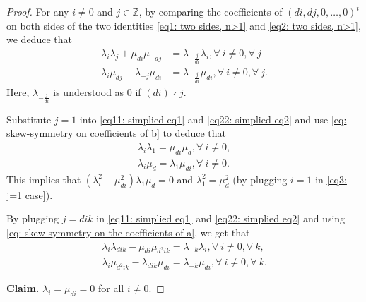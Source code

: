 \documentclass[12pt]{amsart}
\theoremstyle{definition}
\theoremstyle{remark}
\begin{document}
\begin{proof}
For any $i\neq 0$ and $j\in\mathbb{Z}$, by comparing the coefficients of $(di,dj,0,\ldots,0)^t$ on both sides of the two identities \eqref{eq1: two sides, n>1} and \eqref{eq2: two sides, n>1}, we deduce that 
\begin{align}
\label{eq11: simplied eq1} \lambda_i\lambda_j+\mu_{di}\mu_{-dj}&=\lambda_{-\frac{j}{di}}\lambda_i, \forall~ i\neq 0, \forall ~j\\
\label{eq22: simplied eq2} \lambda_i\mu_{dj}+\lambda_{-j}\mu_{di}&=\lambda_{-\frac{j}{di}}\mu_{di}, \forall~i\neq 0,\forall~j.
\end{align}
Here, $\lambda_{-\frac{j}{di}}$ is understood as 0 if $(di)\nmid j$.

Substitute $j=1$ into \eqref{eq11: simplied eq1} and 
\eqref{eq22: simplied eq2} and use \eqref{eq: skew-symmetry on coefficients of b} to deduce that 
\begin{align}
\label{eq3: j=1 case} \lambda_i\lambda_1=\mu_{di}\mu_{d}, \forall~ i\neq 0,\\
\label{eq4: j=1 case} \lambda_i\mu_d=\lambda_1\mu_{di},\forall~i\neq 0.
\end{align}
This implies that $(\lambda_i^2-\mu_{di}^2)\lambda_1\mu_d=0$ and $\lambda_1^2=\mu_d^2$ (by plugging $i=1$ in \eqref{eq3: j=1 case}). 

By plugging $j=dik$ in \eqref{eq11: simplied eq1} and \eqref{eq22: simplied eq2} and using \eqref{eq: skew-symmetry on the coefficients of a}, we get that
\begin{align}
\label{eq5} \lambda_i\lambda_{dik}-\mu_{di}\mu_{d^2ik}=\lambda_{-k}\lambda_i, \forall ~i\neq 0, \forall~ k, \\
\label{eq6} \lambda_i\mu_{d^2ik}-\lambda_{dik}\mu_{di}=\lambda_{-k}\mu_{di},\forall~i\neq 0, \forall~k.
\end{align}

\textbf{Claim.} $\lambda_i=\mu_{di}=0$ for all $i\neq 0$.


\end{proof}
\end{document}

